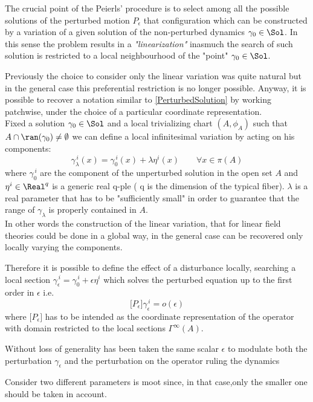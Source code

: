\documentclass[Main]{subfiles}
\begin{document}
		The crucial point of the Peierls' procedure  is to select among all the possible solutions of the perturbed motion $P_\epsilon$ that configuration which can be constructed by a variation of a given solution of the non-perturbed dynamics $\gamma_0 \in \Sol$.
		In this sense the problem results in a \emph{"linearization"} inasmuch the  search of such solution is restricted to a local neighbourhood of the "point" $\gamma_0\in \Sol$.

		Previously the choice to consider only the linear variation was quite natural but in the general case this preferential restriction is no longer possible.
		Anyway, it is possible to  recover a notation similar to \ref{PerturbedSolution} by working patchwise, under the choice of a particular coordinate representation.
		\\
		Fixed a solution $\gamma_0 \in \Sol$ and a local trivializing chart $(A, \phi_A)$ such that $A\cap \ran(\gamma_0) \neq \emptyset$ we can define a local infinitesimal variation by acting on his components:
		\begin{displaymath}
			\gamma_\lambda ^{\, i}(x) = \gamma_0^{\, i}(x) + \lambda \eta^i(x) \qquad \forall x\in \pi(A)
		\end{displaymath}
		where $ \gamma_0^{\, i}$ are the component of the unperturbed solution in the open set $A$ and $\eta^i\in \Real^q$ is a generic real q-ple ( q is the dimension of the typical fiber).
		$\lambda$ is a real parameter that has to be "sufficiently small" in order to guarantee that the range of $\gamma_\lambda$ is properly contained in $A$.
		\\
		In other words the construction of the linear variation, that for linear field theories could be done in a global way, in the general case can be recovered only locally varying the components.
		
		Therefore it is possible to define the effect of a disturbance locally, searching a local section $\gamma_\epsilon^{\, i} = \gamma_0^{\, i} + \epsilon \eta^{i}$ which solves  the perturbed equation up to the first order in $\epsilon$ i.e. 
		\begin{displaymath}
			\big[ P_\epsilon \big] \gamma_\epsilon^{\,i} = o(\epsilon)
		\end{displaymath}
		where $\big[ P_\epsilon \big] $ has to be intended as the coordinate representation of the operator with domain restricted to the local sections $\Gamma^\infty(A)$.
		\begin{observation}
		Without loss of generality has been taken the same scalar $\epsilon$  to modulate both the perturbation $\gamma_\epsilon$ and the %
		perturbation on the operator ruling the dynamics
		
		Consider two different parameters is moot since, in that case,only the smaller one should be taken in account.
		\end{observation}
\end{document}
